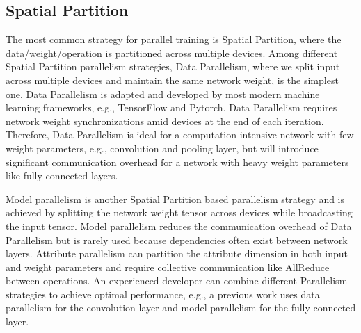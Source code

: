 \documentclass[sigplan, nonacm]{acmart}\settopmatter{printfolios=true,printccs=false,printacmref=false}
\begin{document}
 \subsection{Spatial Partition}
 The most common strategy for parallel training is Spatial Partition, where the data/weight/operation is partitioned across multiple devices. Among different Spatial Partition parallelism strategies, Data Parallelism\cite{krizhevsky2012imagenet}, where we split input across multiple devices and maintain the same network weight, is the simplest one. Data Parallelism is adapted and developed by most modern machine learning frameworks, e.g., TensorFlow\cite{abadi2016tensorflow} and Pytorch\cite{paszke2019pytorch}. Data Parallelism requires network weight synchronizations amid devices at the end of each iteration. Therefore, Data Parallelism is ideal for a computation-intensive network with few weight parameters, e.g., convolution and pooling layer, but will introduce significant communication overhead for a network with heavy weight parameters like fully-connected layers.\par
  Model parallelism\cite{dean2012large} is another Spatial Partition based parallelism strategy and is achieved by splitting the network weight tensor across devices while broadcasting the input tensor. Model parallelism reduces the communication overhead of Data Parallelism but is rarely used because dependencies often exist between network layers. Attribute parallelism\cite{jia2019beyond} can partition the attribute dimension in both input and weight parameters and require collective communication like AllReduce between operations. An experienced developer can combine different Parallelism strategies to achieve optimal performance, e.g., a previous work\cite{krizhevsky2014one} uses data parallelism for the convolution layer and model parallelism for the fully-connected layer.\par
\end{document}
